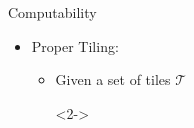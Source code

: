 \documentclass[usenames,dvipsnames]{beamer}
\newcommand{\cT}{\mathcal{T}}
\begin{document}
\begin{frame}{Computability}
    \begin{itemize}
        \item<1-> Proper Tiling:
        \begin{itemize}
            \item<2-> Given a set of tiles $\cT$
            \item[]<2->
\end{itemize}
\end{itemize}
\end{frame}
\end{document}
